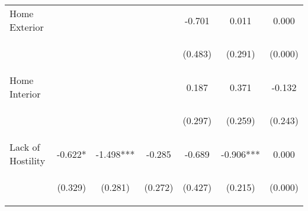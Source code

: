 \begin{tabular}{lcccccc}
\noalign{\smallskip}Home Exterior &  &  &  & -0.701 & 0.011 & 0.000\\
 & \begin{footnotesize}\end{footnotesize} & \begin{footnotesize}\end{footnotesize} & \begin{footnotesize}\end{footnotesize} & \begin{footnotesize}(0.483)\end{footnotesize} & \begin{footnotesize}(0.291)\end{footnotesize} & \begin{footnotesize}(0.000)\end{footnotesize}\\
\noalign{\smallskip}Home Interior &  &  &  & 0.187 & 0.371 & -0.132\\
 & \begin{footnotesize}\end{footnotesize} & \begin{footnotesize}\end{footnotesize} & \begin{footnotesize}\end{footnotesize} & \begin{footnotesize}(0.297)\end{footnotesize} & \begin{footnotesize}(0.259)\end{footnotesize} & \begin{footnotesize}(0.243)\end{footnotesize}\\
\noalign{\smallskip}Lack of Hostility & -0.622* & -1.498*** & -0.285 & -0.689 & -0.906*** & 0.000\\
 & \begin{footnotesize}(0.329)\end{footnotesize} & \begin{footnotesize}(0.281)\end{footnotesize} & \begin{footnotesize}(0.272)\end{footnotesize} & \begin{footnotesize}(0.427)\end{footnotesize} & \begin{footnotesize}(0.215)\end{footnotesize} & \begin{footnotesize}(0.000)\end{footnotesize}\\

\end{tabular}

